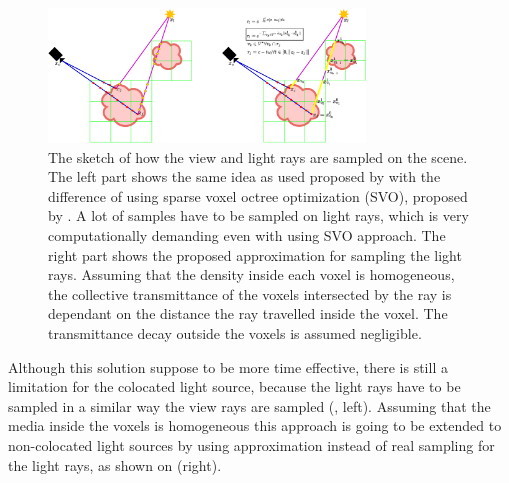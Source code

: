 \documentclass[english]{article}
\begin{document}


\begin{figure}[h]
    \centering
    \includegraphics[width=0.75\textwidth]{img/light_nrf_approx_both.png}
    \caption{The sketch of how the view and light rays are sampled on the scene. The left part shows the same idea as used proposed by \cite{nrf2020} with the difference of using sparse voxel octree optimization (SVO), proposed by \cite{nsvf2020}. A lot of samples have to be sampled on light rays, which is very computationally demanding even with using SVO approach. The right part shows the proposed approximation for sampling the light rays. Assuming that the density inside each voxel is homogeneous, the collective transmittance of the voxels intersected by the ray is dependant on the distance the ray travelled inside the voxel. The transmittance decay outside the voxels is assumed negligible.}
    \label{fig:light_nrf_approx_both}
\end{figure}

Although this solution suppose to be more time effective, there is still a limitation for the colocated light source, because the light rays have to be sampled in a similar way the view rays are sampled (, left). Assuming that the media inside the voxels is homogeneous this approach is going to be extended to non-colocated light sources by using approximation instead of real sampling for the light rays, as shown on  (right).
\end{document}
